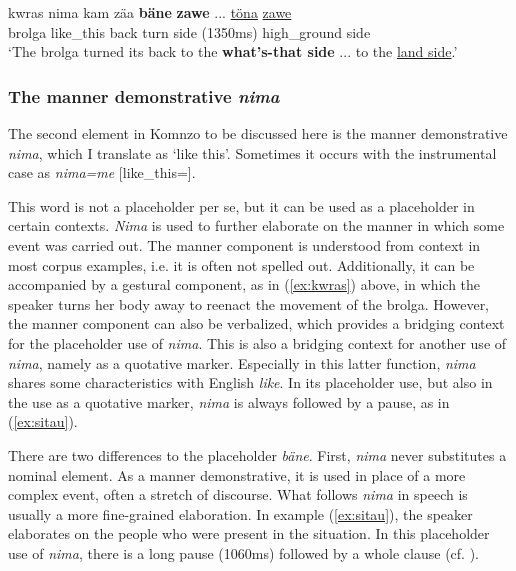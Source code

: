 \documentclass[output=paper,colorlinks,citecolor=brown]{langscibook}
\begin{document}
\ea \label{ex:kwras}
    \gll kwras nima kam zäa \textbf{bäne} \textbf{zawe} ... \uline{töna} \uline{zawe}\\
    brolga like\_this back turn  side (1350ms) high\_ground side\\
    \glt `The brolga turned its back to the \textbf{what's-that side} ... to the \uline{land side}.' 
\z

\subsubsection{The manner demonstrative \textit{nima}}\label{sec:doehler:nimaintro}

The second element in Komnzo to be discussed here is the manner demonstrative \textit{nima}, which I translate as `like this'. Sometimes it occurs with the instrumental case as \textit{nima=me} [like\_this=].

This word is not a placeholder per se, but it can be used as a placeholder in certain contexts. \textit{Nima} is used to further elaborate on the manner in which some event was carried out. The manner component is understood from context in most corpus examples, i.e. it is often not spelled out. Additionally, it can be accompanied by a gestural component, as in (\ref{ex:kwras}) above, in which the speaker turns her body away to reenact the movement of the brolga. However, the manner component can also be verbalized, which provides a bridging context for the placeholder use of \textit{nima}. This is also a bridging context for another use of \textit{nima}, namely as a quotative marker. Especially in this latter function, \textit{nima} shares some characteristics with English \textit{like}. In its placeholder use, but also in the use as a quotative marker, \textit{nima} is always followed by a pause, as in (\ref{ex:sitau}).

There are two differences to the placeholder \textit{bäne}. First, \textit{nima} never substitutes a nominal element. As a manner demonstrative, it is used in place of a more complex event, often a stretch of discourse. What follows \textit{nima} in speech is usually a more fine-grained elaboration. In example (\ref{ex:sitau}), the speaker elaborates on the people who were present in the situation. In this placeholder use of \textit{nima}, there is a long pause (1060ms) followed by a whole clause (cf. ).
\end{document}
